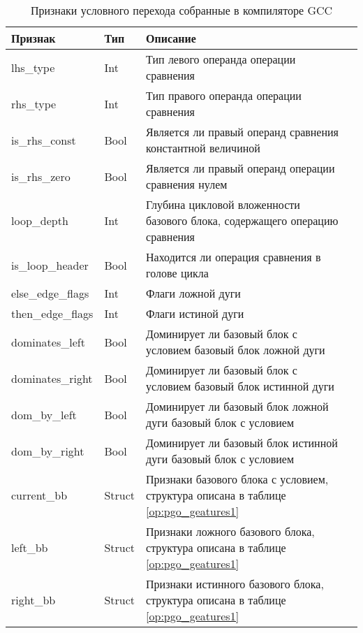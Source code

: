 \begin{table} [htbp]
	\raggedright
	\begin{threeparttable}%
		\caption{Признаки условного перехода собранные в компиляторе GCC}\label{op:pgo_geatures2}%
		\begin{tabular}{| m{4cm} | m{2cm} |  m{9cm}l |}
		\hline
			\hline
			\centering \textbf{Признак}			 & \centering  \textbf{Тип} &  \centering  \textbf{Описание} & \\
			\hline
			\centering lhs\_type			 & \centering  Int &   Тип левого операнда операции сравнения & \\
			\hline
			\centering rhs\_type			 & \centering  Int &    Тип правого операнда операции сравнения & \\
			\hline
			\centering is\_rhs\_const			 & \centering  Bool &    Является ли правый операнд сравнения константной величиной & \\
			\hline
			\centering is\_rhs\_zero			 & \centering  Bool &    Является ли правый операнд операции сравнения нулем & \\
			\hline
			\centering loop\_depth			 & \centering  Int &    Глубина цикловой вложенности базового блока, содержащего операцию сравнения & \\
			\hline
			\centering is\_loop\_header			 & \centering  Bool &    Находится ли операция сравнения в голове цикла  & \\
			\hline
			\centering else\_edge\_flags			 & \centering  Int &    Флаги ложной дуги & \\
			\hline
			\centering then\_edge\_flags			 & \centering  Int &    Флаги истиной дуги & \\
			\hline
			\centering dominates\_left			 & \centering  Bool &    Доминирует ли базовый блок с условием  базовый блок ложной дуги   & \\	
			\hline
			\centering dominates\_right			 & \centering  Bool &    Доминирует ли базовый блок с условием  базовый блок истинной дуги  & \\	
			\hline
			\centering dom\_by\_left			 & \centering  Bool &    Доминирует ли базовый блок ложной дуги базовый блок с условием  & \\	
			\hline
			\centering dom\_by\_right			 & \centering  Bool &    Доминирует ли базовый блок истинной дуги базовый блок с условием  & \\	
			\hline
			\centering current\_bb			 & \centering  Struct &    Признаки базового блока с условием, структура описана в таблице \ref{op:pgo_geatures1}  & \\	
			\hline
			\centering left\_bb			 & \centering  Struct &     Признаки ложного базового блока, структура описана в таблице \ref{op:pgo_geatures1} & \\	
			\hline
			\centering right\_bb			 & \centering  Struct &    Признаки истинного базового блока, структура описана в таблице \ref{op:pgo_geatures1} & \\	
			\hline
			\hline
		\end{tabular}
	\end{threeparttable}
\end{table}
